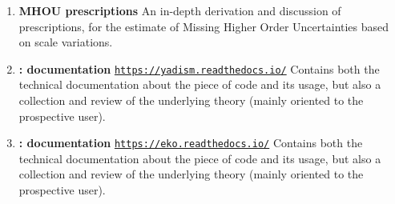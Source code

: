 \documentclass[10pt, a4paper, sans]{moderncv}
\newcommand{\tturl}[1]{\texttt{\url{#1}}}
\begin{document}
\begin{multicols}{2}
\begin{enumerate}
    \item \textbf{MHOU prescriptions}
      \newline
      An in-depth derivation and discussion of prescriptions, for the estimate
      of Missing Higher Order Uncertainties based on scale variations.
    \item \textbf{\yadism: documentation}
      \newline
      \tturl{https://yadism.readthedocs.io/}
      \newline
      Contains both the technical documentation about the piece of code and its
      usage, but also a collection and review of the underlying theory (mainly
      oriented to the prospective user).
    \item \textbf{\eko: documentation}
      \newline
      \tturl{https://eko.readthedocs.io/}
      \newline
      Contains both the technical documentation about the piece of code and its
      usage, but also a collection and review of the underlying theory (mainly
      oriented to the prospective user).
\end{enumerate}


\end{multicols}
\end{document}
